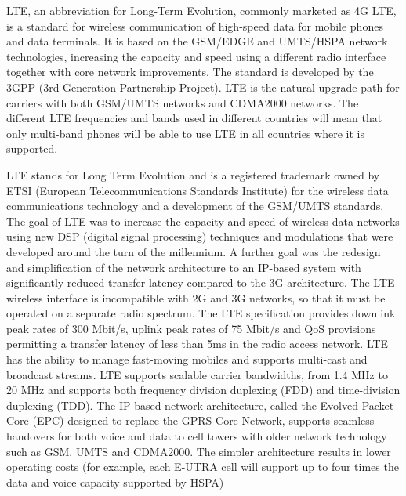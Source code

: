 


LTE, an abbreviation for Long-Term Evolution, commonly marketed as 4G LTE, is a standard for wireless communication of high-speed data for mobile phones and data terminals. It is based on the GSM/EDGE and UMTS/HSPA network technologies, increasing the capacity and speed using a different radio interface together with core network improvements. The standard is developed by the 3GPP (3rd Generation Partnership Project). LTE is the natural upgrade path for carriers with both GSM/UMTS networks and CDMA2000 networks. The different LTE frequencies and bands used in different countries will mean that only multi-band phones will be able to use LTE in all countries where it is supported.

     LTE stands for Long Term Evolution and is a registered trademark owned by ETSI (European Telecommunications Standards Institute) for the wireless data communications technology and a development of the GSM/UMTS standards. The goal of LTE was to increase the capacity and speed of wireless data networks using new DSP (digital signal processing) techniques and modulations that were developed around the turn of the millennium. A further goal was the redesign and simplification of the network architecture to an IP-based system with significantly reduced transfer latency compared to the 3G architecture. The LTE wireless interface is incompatible with 2G and 3G networks, so that it must be operated on a separate radio spectrum. The LTE specification provides downlink peak rates of 300 Mbit/s, uplink peak rates of 75 Mbit/s and QoS provisions permitting a transfer latency of less than 5ms in the radio access network. LTE has the ability to manage fast-moving mobiles and supports multi-cast and broadcast streams. LTE supports scalable carrier bandwidths, from 1.4 MHz to 20 MHz and supports both frequency division duplexing (FDD) and time-division duplexing (TDD). The IP-based network architecture, called the Evolved Packet Core (EPC) designed to replace the GPRS Core Network, supports seamless handovers for both voice and data to cell towers with older network technology such as GSM, UMTS and CDMA2000. The simpler architecture results in lower operating costs (for example, each E-UTRA cell will support up to four times the data and voice capacity supported by HSPA)

